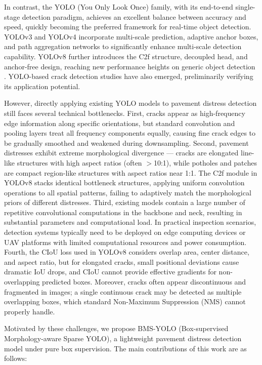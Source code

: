 \documentclass[twocolumn]{sn-jnl}
\begin{document}
	In contrast, the YOLO (You Only Look Once) family, with its end-to-end single-stage detection paradigm, achieves an excellent balance between accuracy and speed, quickly becoming the preferred framework for real-time object detection. YOLOv3 and YOLOv4 incorporate multi-scale prediction, adaptive anchor boxes, and path aggregation networks to significantly enhance multi-scale detection capability. YOLOv8 further introduces the C2f structure, decoupled head, and anchor-free design, reaching new performance heights on generic object detection \cite{Jocher2023}. YOLO-based crack detection studies have also emerged, preliminarily verifying its application potential.

	However, directly applying existing YOLO models to pavement distress detection still faces several technical bottlenecks. First, cracks appear as high-frequency edge information along specific orientations, but standard convolution and pooling layers treat all frequency components equally, causing fine crack edges to be gradually smoothed and weakened during downsampling. Second, pavement distresses exhibit extreme morphological divergence --- cracks are elongated line-like structures with high aspect ratios (often $>$10:1), while potholes and patches are compact region-like structures with aspect ratios near 1:1. The C2f module in YOLOv8 stacks identical bottleneck structures, applying uniform convolution operations to all spatial patterns, failing to adaptively match the morphological priors of different distresses. Third, existing models contain a large number of repetitive convolutional computations in the backbone and neck, resulting in substantial parameters and computational load. In practical inspection scenarios, detection systems typically need to be deployed on edge computing devices or UAV platforms with limited computational resources and power consumption. Fourth, the CIoU loss used in YOLOv8 considers overlap area, center distance, and aspect ratio, but for elongated cracks, small positional deviations cause dramatic IoU drops, and CIoU cannot provide effective gradients for non-overlapping predicted boxes. Moreover, cracks often appear discontinuous and fragmented in images; a single continuous crack may be detected as multiple overlapping boxes, which standard Non-Maximum Suppression (NMS) cannot properly handle.

	Motivated by these challenges, we propose BMS-YOLO (Box-supervised Morphology-aware Sparse YOLO), a lightweight pavement distress detection model under pure box supervision. The main contributions of this work are as follows:
\end{document}
